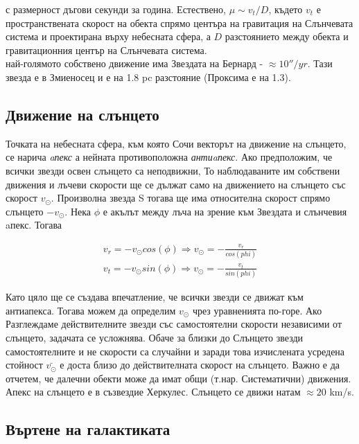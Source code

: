 \documentclass[a4paper,12pt]{article}
\begin{document}
с размерност дъгови секунди за година. Естествено, $\mu \sim v_t/D$,  където $v_t$  е пространствената скорост на обекта спрямо  центъра на гравитация на Слънчевата система и проектирана върху небесната сфера, а $D$ разстоянието между обекта и  гравитационния център на Слънчевата система.\\

най-голямото собствено движение има Звездата на Бернард - $\approx 10''/yr$. Тази звезда  е в Змиеносец и е на 1.8 pc разстояние (Проксима е на 1.3).



\subsection{Движение на слънцето}

Точката на небесната сфера, към която Сочи векторът на движение на слънцето, се нарича \textit{aпекс} а нейната противоположна \textit{антиaпекс}. Ако предположим, че всички звезди освен слънцето са неподвижни, То наблюдаваните им собствени движения и лъчеви скорости ще се дължат само на движението на слънцето със скорост $v_\odot$. Произволна звезда S тогава ще има относителна скорост спрямо слънцето $-v_\odot$.  Нека $\phi$ е акълът между лъча на зрение към Звездата и слънчевия aпекс. Тогава

\begin{gather}
v_r = - v_\odot cos(\phi) \Rightarrow v_\odot = - \frac{v_r}{cos(phi)}\\
v_t = - v_\odot sin(\phi) \Rightarrow v_\odot = - \frac{v_t}{sin(phi)}
\end{gather}

Като цяло ще се създава впечатление, че всички звезди се движат към антиапекса. Тогава можем да определим $v_\odot$ чрез уравненията по-горе. Ако Разглеждаме действителните звезди със самостоятелни скорости независими от слънцето, задачата се усложнява. Обаче  за близки до Слънцето звезди самостоятелните и не скорости са случайни и заради това  изчислената усредена стойност $\bar{v_\odot}$ е доста близо до действителната скорост на слънцето. Важно е да отчетем, че далечни обекти може да имат общи (т.нар. Систематични) движения. Апекс на слънцето е в съзвездие Херкулес. Слънцето се движи натам $\approx 20$ km/s.

\subsection{Въртене на галактиката}
\end{document}
